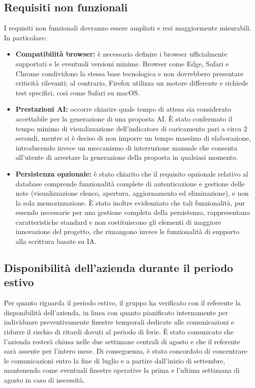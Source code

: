 \subsection{Requisiti non funzionali}
I requisiti non funzionali dovranno essere ampliati e resi maggiormente misurabili. In particolare:
\begin{itemize}
    \item \textbf{Compatibilità browser:} è necessario definire i browser ufficialmente supportati e le eventuali versioni minime. Browser come Edge, Safari e Chrome condividono la stessa base tecnologica e non dovrebbero presentare criticità rilevanti; al contrario, Firefox utilizza un motore differente e richiede test specifici, così come Safari su macOS.
    \item \textbf{Prestazioni AI:} occorre chiarire quale tempo di attesa sia considerato accettabile per la generazione di una proposta AI. È stato confermato il tempo minimo di visualizzazione dell'indicatore di caricamento pari a circa 2 secondi, mentre si è deciso di non imporre un tempo massimo di elaborazione, introducendo invece un meccanismo di interruzione manuale che consenta all'utente di arrestare la generazione della proposta in qualsiasi momento.
    \item \textbf{Persistenza opzionale:} è stato chiarito che il requisito opzionale relativo al database comprende funzionalità complete di autenticazione e gestione delle note (visualizzazione elenco, apertura, aggiornamento ed eliminazione), e non la sola memorizzazione. È stato inoltre evidenziato che tali funzionalità, pur essendo necessarie per una gestione completa della persistenza, rappresentano caratteristiche standard e non costituiscono gli elementi di maggiore innovazione del progetto, che rimangono invece le funzionalità di supporto alla scrittura basate su IA.
\end{itemize}

\subsection{Disponibilità dell'azienda durante il periodo estivo}

Per quanto riguarda il periodo estivo, il gruppo ha verificato con il referente la disponibilità dell'azienda, in linea con quanto pianificato internamente per individuare preventivamente finestre temporali dedicate alle comunicazioni e ridurre il rischio di ritardi dovuti al periodo di ferie. È stato comunicato che l'azienda resterà chiusa nelle due settimane centrali di agosto e che il referente sarà assente per l'intero mese. Di conseguenza, è stato concordato di concentrare le comunicazioni entro la fine di luglio e a partire dall'inizio di settembre, mantenendo come eventuali finestre operative la prima e l'ultima settimana di agosto in caso di necessità.
\newpage
